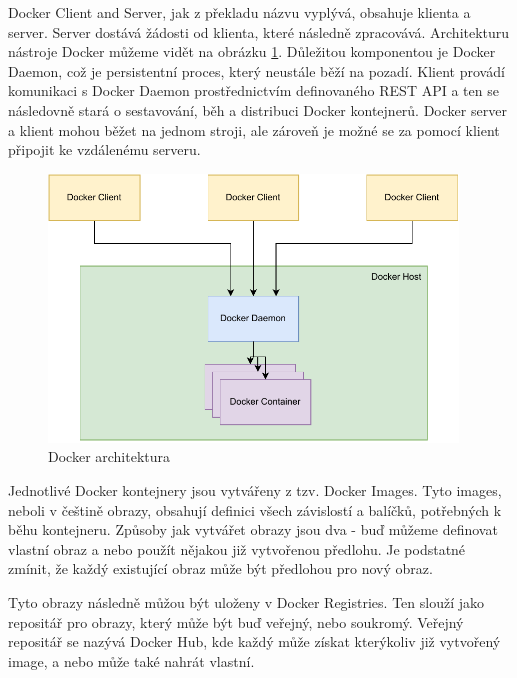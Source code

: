 Docker Client and Server, jak z překladu názvu vyplývá, obsahuje klienta a server. Server dostává žádosti od klienta, které následně zpracovává. Architekturu nástroje Docker můžeme vidět na obrázku \ref{fig:docker_arch}. Důležitou komponentou je Docker Daemon, což je persistentní proces, který neustále běží na pozadí. Klient provádí komunikaci s Docker Daemon prostřednictvím definovaného REST API a ten se následovně stará o sestavování, běh a distribuci Docker kontejnerů. Docker server a klient mohou běžet na jednom stroji, ale zároveň je možné se za pomocí klient připojit ke vzdálenému serveru. 
\cite{turnbull2014docker}\cite{docker_overview}

\begin{figure}[htbp]
    \centering 
    \includegraphics[width=0.97\textwidth]{assets/img/docker_arch.pdf}
    \caption{Docker architektura}
    \label{fig:docker_arch}
\end{figure}

Jednotlivé Docker kontejnery jsou vytvářeny z tzv. Docker Images. Tyto images, neboli v češtině obrazy, obsahují definici všech závislostí a balíčků, potřebných k běhu kontejneru. Způsoby jak vytvářet obrazy jsou dva - buď můžeme definovat vlastní obraz a nebo použít nějakou již vytvořenou předlohu. Je podstatné zmínit, že každý existující obraz může být předlohou pro nový obraz. 

Tyto obrazy následně můžou být uloženy v Docker Registries. Ten slouží jako repositář pro obrazy, který může být buď veřejný, nebo soukromý. Veřejný repositář se nazývá Docker Hub\cite{docker_hub}, kde každý může získat kterýkoliv již vytvořený image, a nebo může také nahrát vlastní. \cite{turnbull2014docker} 

